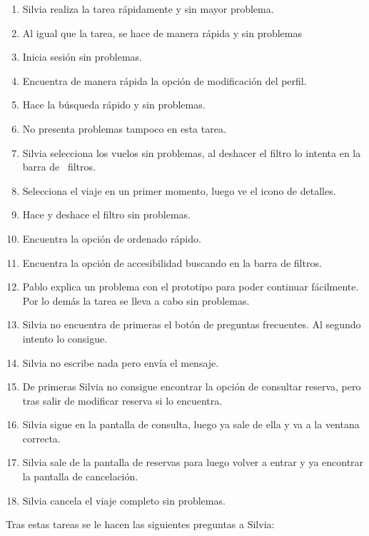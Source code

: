 \begin{enumerate}
    \item Silvia realiza la tarea rápidamente y sin mayor problema.
    \item Al igual que la tarea, se hace de manera rápida y sin problemas
    \item Inicia sesión sin problemas.
    \item Encuentra de manera rápida la opción de modificación del perfil.
    \item Hace la búsqueda rápido y sin problemas.
    \item No presenta problemas tampoco en esta tarea.
    \item Silvia selecciona los vuelos sin problemas, al deshacer el filtro lo intenta en la barra de  filtros.
    \item Selecciona el viaje en un primer momento, luego ve el icono de detalles.
    \item Hace y deshace el filtro sin problemas.
    \item Encuentra la opción de ordenado rápido.
    \item Encuentra la opción de accesibilidad buscando en la barra de filtros.
    \item Pablo explica un problema con el prototipo para poder continuar fácilmente. Por lo demás la tarea se lleva a cabo sin problemas.
    \item Silvia no encuentra de primeras el botón de preguntas frecuentes. Al segundo intento lo consigue.
    \item Silvia no escribe nada pero envía el mensaje.
    \item De primeras Silvia no consigue encontrar la opción de consultar reserva, pero tras salir de modificar reserva si lo encuentra.
    \item Silvia sigue en la pantalla de consulta, luego ya sale de ella y va a la ventana correcta.
    \item Silvia sale de la pantalla de reservas para luego volver a entrar y ya encontrar la pantalla de cancelación.
    \item Silvia cancela el viaje completo sin problemas.
\end{enumerate}

Tras estas tareas se le hacen las siguientes preguntas a Silvia: 

